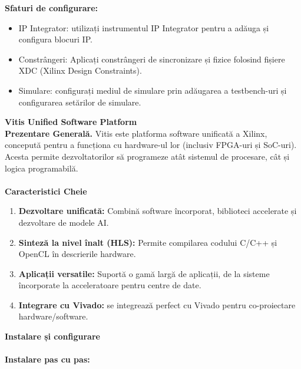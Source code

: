 \documentclass[12pt]{article}
\begin{document}
\textbf{Sfaturi de configurare:}
\begin{itemize}
    \item IP Integrator: utilizați instrumentul IP Integrator pentru a adăuga și configura blocuri IP.
    \item Constrângeri: Aplicați constrângeri de sincronizare și fizice folosind fișiere XDC (Xilinx Design Constraints).
    \item Simulare: configurați mediul de simulare prin adăugarea a testbench-uri și configurarea setărilor de simulare.\\
\end{itemize}
\textbf{Vitis Unified Software Platform}\\
\hspace*{1cm}\textbf{Prezentare Generală.} Vitis este platforma software unificată a Xilinx, concepută pentru a funcționa cu hardware-ul lor (inclusiv FPGA-uri și SoC-uri). Acesta permite dezvoltatorilor să programeze atât sistemul de procesare, cât și logica programabilă.\\\\
\hspace*{1cm}\textbf{Caracteristici Cheie}
\begin{enumerate}
    \item \textbf{Dezvoltare unificată:} Combină software încorporat, biblioteci accelerate și dezvoltare de modele AI.
    \item \textbf{Sinteză la nivel înalt (HLS):} Permite compilarea codului C/C++ și OpenCL în descrierile hardware.
    \item \textbf{Aplicații versatile:} Suportă o gamă largă de aplicații, de la sisteme încorporate la acceleratoare pentru centre de date.
    \item \textbf{Integrare cu Vivado:} se integrează perfect cu Vivado pentru co-proiectare hardware/software.
\end{enumerate}
\textbf{Instalare și configurare}\\\\
\textbf{Instalare pas cu pas:}\\
\end{document}
